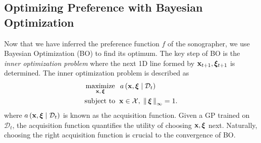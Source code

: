 

\subsection{Optimizing Preference with Bayesian Optimization}\label{section:bo}
Now that we have inferred the preference function \(f\) of the sonographer, we use Bayesian Optimization (BO) to find its optimum.
The key step of BO is the \textit{inner optimization problem} where the next 1D line formed by \(\mathbf{x}_{t+1}, \bm{\xi}_{t+1}\) is determined.
The inner optimization problem is described as
%
\begin{align}
 &\operatorname*{maximize}_{\mathbf{x},\, \bm{\xi}}\;\; a\,(\mathbf{x}, \bm{\xi} \mid \mathcal{D}_t) \\
 &\text{subject to}\;\; \mathbf{x} \in \mathcal{X},\; \left\lVert\, \bm{\xi} \,\right\rVert_{\infty} = 1.
\end{align}
where \(a\,(\mathbf{x}, \bm{\xi} \mid \mathcal{D}_t)\) is known as the acquisition function.
Given a GP trained on \(\mathcal{D}_t\), the acquisition function quantifies the utility of choosing \(\mathbf{x}, \bm{\xi}\) next.
Naturally, choosing the right acquisition function is crucial to the convergence of BO.

